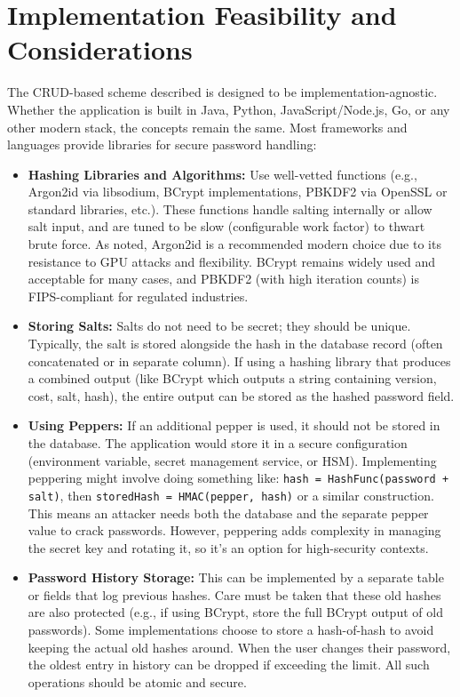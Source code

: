 \documentclass[11pt]{article}
\begin{document}
\section{Implementation Feasibility and Considerations}
The CRUD-based scheme described is designed to be implementation-agnostic. Whether the application is built in Java, Python, JavaScript/Node.js, Go, or any other modern stack, the concepts remain the same. Most frameworks and languages provide libraries for secure password handling:
\begin{itemize}
    \item \textbf{Hashing Libraries and Algorithms:} Use well-vetted functions (e.g., Argon2id via libsodium, BCrypt implementations, PBKDF2 via OpenSSL or standard libraries, etc.). These functions handle salting internally or allow salt input, and are tuned to be slow (configurable work factor) to thwart brute force. As noted, Argon2id is a recommended modern choice due to its resistance to GPU attacks and flexibility. BCrypt remains widely used and acceptable for many cases, and PBKDF2 (with high iteration counts) is FIPS-compliant for regulated industries.
    \item \textbf{Storing Salts:} Salts do not need to be secret; they should be unique. Typically, the salt is stored alongside the hash in the database record (often concatenated or in separate column). If using a hashing library that produces a combined output (like BCrypt which outputs a string containing version, cost, salt, hash), the entire output can be stored as the hashed password field.
    \item \textbf{Using Peppers:} If an additional pepper is used, it should not be stored in the database. The application would store it in a secure configuration (environment variable, secret management service, or HSM). Implementing peppering might involve doing something like: \texttt{hash = HashFunc(password + salt)}, then \texttt{storedHash = HMAC(pepper, hash)} or a similar construction. This means an attacker needs both the database and the separate pepper value to crack passwords. However, peppering adds complexity in managing the secret key and rotating it, so it's an option for high-security contexts.
    \item \textbf{Password History Storage:} This can be implemented by a separate table or fields that log previous hashes. Care must be taken that these old hashes are also protected (e.g., if using BCrypt, store the full BCrypt output of old passwords). Some implementations choose to store a hash-of-hash to avoid keeping the actual old hashes around. When the user changes their password, the oldest entry in history can be dropped if exceeding the limit. All such operations should be atomic and secure.

\end{itemize}
\end{document}
